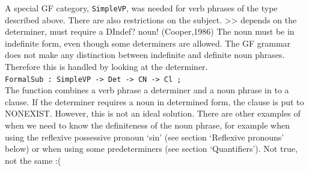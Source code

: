 \documentclass{report}
\begin{document}
A special GF category, \verb|SimpleVP|, was needed for verb phrases of the type
described above.
There are also restrictions on the subject.
>> depends on the determiner, must require a DIndef? noun! (Cooper,1986)
The noun must be in indefinite form, even though some determiners are allowed.
The GF grammar does not make any distinction between indefinite and definite noun
phrases. Therefore this is handled by looking at the determiner. \\
\verb|FormalSub : SimpleVP -> Det -> CN -> Cl ;|\\
The function combines a verb phrase a determiner and a noun phrase in to a clause.
If the determiner requires a noun in determined form, the clause is put to NONEXIST.
However, this is not an ideal solution. There are other examples of when we
need to know the definiteness of the noun phrase, for example when using
the reflexive possessive pronoun `sin' (see section `Reflexive pronouns' below)
or when using some predeterminers (see section `Quantifiers'). Not true, not the same :(


% 
\end{document}
